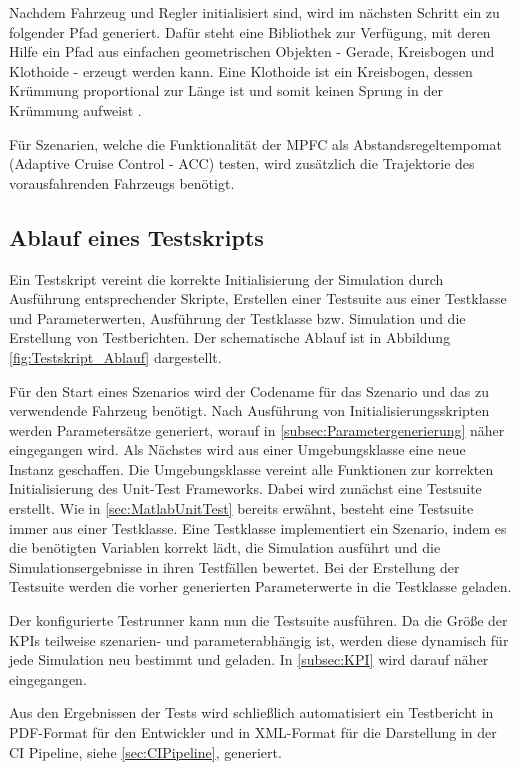 Nachdem Fahrzeug und Regler initialisiert sind, wird im nächsten Schritt ein zu folgender Pfad generiert. Dafür steht eine Bibliothek zur Verfügung, mit deren Hilfe ein Pfad aus einfachen geometrischen Objekten - Gerade, Kreisbogen und Klothoide - erzeugt werden kann. Eine Klothoide ist ein Kreisbogen, dessen Krümmung proportional zur Länge ist und somit keinen Sprung in der Krümmung aufweist \cite{klothoidWiki}.

Für Szenarien, welche die Funktionalität der MPFC als Abstandsregeltempomat (Adaptive Cruise Control - ACC) testen, wird zusätzlich die Trajektorie des vorausfahrenden Fahrzeugs benötigt.

\subsection{Ablauf eines Testskripts} \label{subsec:Testskript}
Ein Testskript vereint die korrekte Initialisierung der Simulation durch Ausführung entsprechender Skripte, Erstellen einer Testsuite aus einer Testklasse und Parameterwerten, Ausführung der Testklasse bzw. Simulation und die Erstellung von Testberichten. Der schematische Ablauf ist in Abbildung \ref{fig:Testskript_Ablauf} dargestellt.

Für den Start eines Szenarios wird der Codename für das Szenario und das zu verwendende Fahrzeug benötigt. Nach Ausführung von Initialisierungsskripten werden Parametersätze generiert, worauf in \ref{subsec:Parametergenerierung} näher eingegangen wird. Als Nächstes wird aus einer Umgebungsklasse eine neue Instanz geschaffen. Die Umgebungsklasse vereint alle Funktionen zur korrekten Initialisierung des Unit-Test Frameworks. Dabei wird zunächst eine Testsuite erstellt. Wie in \ref{sec:MatlabUnitTest} bereits erwähnt, besteht eine Testsuite immer aus einer Testklasse. Eine Testklasse implementiert ein Szenario, indem es die benötigten Variablen korrekt lädt, die Simulation ausführt und die Simulationsergebnisse in ihren Testfällen bewertet. Bei der Erstellung der Testsuite werden die vorher generierten Parameterwerte in die Testklasse geladen.

Der konfigurierte Testrunner kann nun die Testsuite ausführen. Da die Größe der KPIs teilweise szenarien- und parameterabhängig ist, werden diese dynamisch für jede Simulation neu bestimmt und geladen. In \ref{subsec:KPI} wird darauf näher eingegangen.

Aus den Ergebnissen der Tests wird schließlich automatisiert ein Testbericht in PDF-Format für den Entwickler und in XML-Format für die Darstellung in der CI Pipeline, siehe \ref{sec:CIPipeline}, generiert.

